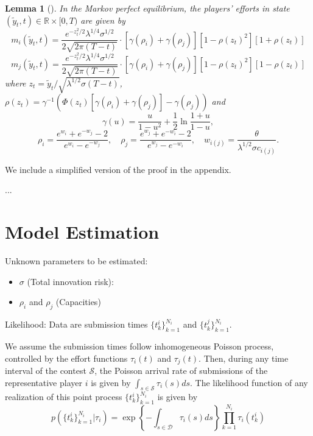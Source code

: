 \documentclass[a4paper, 11pt]{article}
\theoremstyle{plain} %
\newtheorem{lemma}{Lemma}
\begin{document}
\begin{lemma}[\citealt{ryvkin2022fight}]
In the Markov perfect equilibrium, the players’ efforts in state $(\tilde{y}_t, t) \in\mathbb{R}\times[0, T)$ are given by
\begin{equation*}
m_{i}(\tilde{y}_t, t) = \frac{e^{-z_t^2/2}\lambda^{1/4}\sigma^{1/2}}{2\sqrt{2\pi(T-t)}} \cdot \left[\gamma(\rho_{i}) + \gamma(\rho_{j})\right]\left[1-\rho(z_t)^2\right]\left[1 + \rho(z_t)\right]
\end{equation*}
\begin{equation*}
m_{j}(\tilde{y}_t, t) = \frac{e^{-z_t^2/2}\lambda^{1/4}\sigma^{1/2}}{2\sqrt{2\pi(T-t)}} \cdot 
 \left[\gamma(\rho_{i}) + \gamma(\rho_{j})\right]\left[1-\rho(z_t)^2\right]\left[1 - \rho(z_t)\right]
\end{equation*}
where $z_t = \tilde{y}_t / \sqrt{\lambda^{1/2}\sigma(T-t)}$, $\rho(z_t) = \gamma^{-1}\left(\Phi(z_t)\left[\gamma(\rho_{i})+\gamma(\rho_{j})\right]-\gamma(\rho_{j})\right)$ and 
\begin{equation*}
\gamma(u) = \frac{u}{1-u^2} + \frac{1}{2}\ln\frac{1+u}{1-u},
\end{equation*}
\begin{equation*}
\rho_{i} = \frac{e^{w_{i}}+e^{-w_{j}}-2}{e^{w_{i}}-e^{-w_{j}}},
\quad
\rho_{j} = \frac{e^{w_{j}}+e^{-w_{i}}-2}{e^{w_{j}}-e^{-w_{i}}},
\quad
w_{i(j)} = \frac{\theta}{\lambda^{1/2}\sigma c_{i(j)}}.
\end{equation*}
\end{lemma}

We include a simplified version of the proof in the appendix.

...


\section{Model Estimation}

Unknown parameters to be estimated: 
\begin{itemize}
	\item $\sigma$ (Total innovation risk): 
	\item $\rho_i$ and $\rho_j$ (Capacities)
\end{itemize}

Likelihood: 
Data are submission times $\{t^i_k\}_{k=1}^{N_i}$ and $\{t^j_k\}_{k=1}^{N_i}$. 

We assume the submission times follow inhomogeneous Poisson process, controlled by the effort functions $\tau_i(t)$ and $\tau_j(t)$. 
Then, during any time interval of the contest $\mathcal{S}$, the Poisson arrival rate of submissions of the representative player $i$ is given by $\int_{s\in\mathcal{S}}\tau_i(s)ds$. 
The likelihood function of any realization of this point process $\{t^i_k\}_{k=1}^{N_i}$ is given by 
\begin{equation*}
p\left(\{t^i_k\}_{k=1}^{N_i} | \tau_i\right) = \exp\left\{-\int_{s\in\mathcal{D}}\tau_i(s)ds\right\}\prod_{k=1}^{N_i}\tau_i(t^i_k)
\end{equation*}
\end{document}
